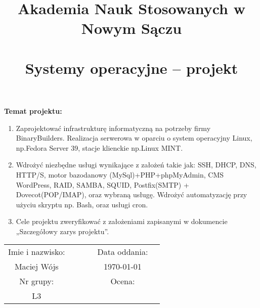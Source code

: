 \documentclass[a4paper]{article}
\title{\textbf{Akademia Nauk Stosowanych w Nowym Sączu}\\\smaller{Wydział Nauk Inżynieryjnych}\vspace*{1em} \\ \textbf{Systemy operacyjne – projekt}\vspace*{0.5em}\\\smaller{studia stacjonarne\\semestr letni 2023/2024}}
\author{}
\date{}
\begin{document}
\maketitle

\textbf{Temat projektu:}
\begin{enumerate}
      \item Zaprojektować infrastrukturę informatyczną na potrzeby firmy BinaryBuilders. Realizacja
            serwerowa w oparciu o system operacyjny Linux, np.\@ Fedora Server 39, stacje klienckie
            np.\@ Linux MINT. %

      \item Wdrożyć niezbędne usługi wynikające z założeń takie jak: SSH, DHCP, DNS, HTTP/S,
            motor bazodanowy (MySql)+PHP+phpMyAdmin, CMS WordPress, RAID, SAMBA,
            SQUID, Postfix(SMTP) + Dovecot(POP/IMAP), oraz wybraną usługę. Wdrożyć %
            automatyzację przy użyciu skryptu np. Bash, oraz usługi cron.
      \item Cele projektu zweryfikować z założeniami zapisanymi w dokumencie „Szczegółowy
            zarys projektu”.
\end{enumerate}

\renewcommand{\arraystretch}{1.25}
\setlength{\tabcolsep}{12pt}

\begin{table}[h!]
      \centering
      \begin{tabular}{cccccc}
            Imie i nazwisko: &   &  &  & Data oddania: \\
            Maciej Wójs      &   &  &  & \today        \\
            Nr grupy:        &   &  &  & Ocena:        \\
            L3               &                         \\
      \end{tabular}
\end{table}

\newpage
\tableofcontents
\newpage
\listoffigures
\newpage
\end{document}
